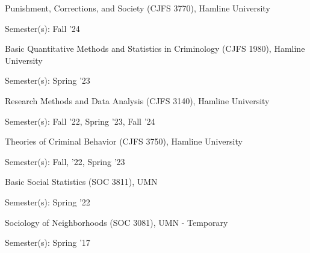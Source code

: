 \documentclass[letterpaper]{article}
\renewenvironment{itemize}{
  \begin{list}{}{
    \setlength{\leftmargin}{1.5em}
  }
}{
  \end{list}
}
\begin{document}
\begin{itemize} 

\item Punishment, Corrections, and Society (CJFS 3770), Hamline University

\begin{itemize}
	\item Semester(s): Fall '24
\end{itemize}

\item Basic Quantitative Methods and Statistics in Criminology (CJFS 1980), Hamline University

\begin{itemize}
	\item Semester(s): Spring '23
\end{itemize}

\item Research Methods and Data Analysis (CJFS 3140), Hamline University
\begin{itemize}
	\item Semester(s): Fall '22, Spring '23, Fall '24
\end{itemize}

\item Theories of Criminal Behavior (CJFS 3750), Hamline University

\begin{itemize}
	\item Semester(s): Fall, '22, Spring '23
\end{itemize}

\item Basic Social Statistics (SOC 3811), UMN

\begin{itemize}
	\item Semester(s): Spring '22
\end{itemize}

\item Sociology of Neighborhoods (SOC 3081), UMN - Temporary

\begin{itemize}
	\item Semester(s): Spring '17
\end{itemize}

\end{itemize}
\end{document}

